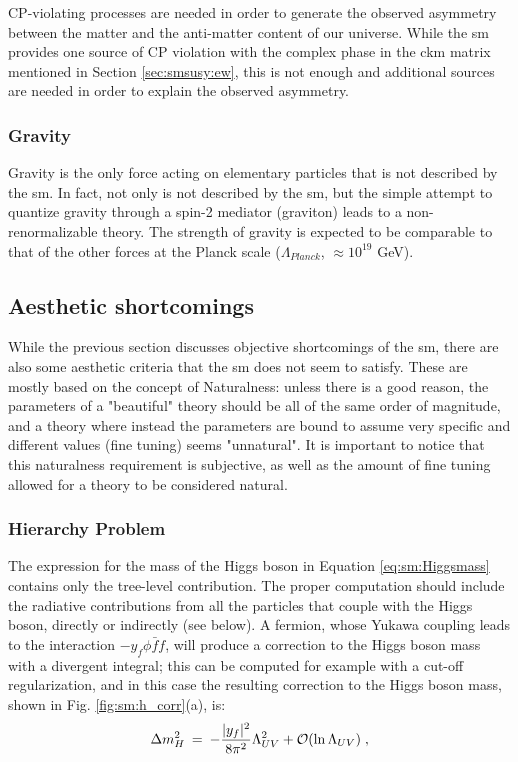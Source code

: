 CP-violating processes are needed in order to generate the observed asymmetry between the matter and the anti-matter content of our universe. While the \gls{sm} provides one source of CP violation with the complex phase in the \gls{ckm} matrix mentioned in Section \ref{sec:smsusy:ew}, this is not enough and additional sources are needed in order to explain the observed asymmetry.

\subsubsection*{Gravity}

Gravity is the only force acting on elementary particles that is not described by the \gls{sm}. In fact, not only is not described by the \gls{sm}, but the simple attempt to quantize gravity through a spin-2  mediator (graviton) leads to a non-renormalizable theory. The strength of gravity is expected to be comparable to that of the other forces at the Planck scale ($\Lambda_{Planck}$, $\approx 10^{19}$ GeV). 

\subsection{Aesthetic shortcomings}
\label{sec:sm:aesthetics}

While the previous section discusses objective shortcomings of the \gls{sm}, there are also some aesthetic criteria that the \gls{sm} does not seem to satisfy. These are mostly based on the concept of Naturalness: unless there is a good reason, the parameters of a "beautiful" theory should be all of the same order of magnitude, and a theory where instead the parameters are bound to assume very specific and different values (fine tuning) seems "unnatural". It is important to notice that this naturalness requirement is subjective, as well as the amount of fine tuning allowed for a theory to be considered natural.


\subsubsection*{Hierarchy Problem}

The expression for the mass of the Higgs boson in Equation \ref{eq:sm:Higgsmass} contains only the tree-level contribution. The proper computation should include the radiative contributions from all the particles that couple with the Higgs boson, directly or indirectly (see below). A fermion, whose Yukawa coupling leads to the interaction $-y_f \phi \bar{f} f$, will produce a correction to the Higgs boson mass with a divergent integral; this can be computed for example with a cut-off regularization, and in this case the resulting correction to the Higgs boson mass, shown in Fig. \ref{fig:sm:h_corr}(a), is:
\begin{equation}
\Delta m_H^2 \>=\>  
-{|y_f|^2\over 8 \pi^2} \Lambda_{UV}^2 + \mathcal{O}(\ln \Lambda_{UV} ) \; ,
\label{eq:divhf}
\end{equation}


